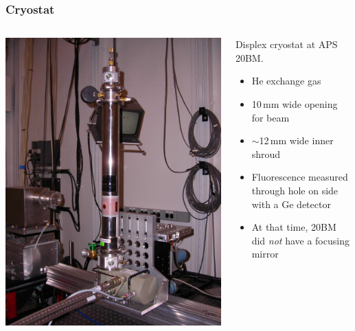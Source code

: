 \documentclass[10pt, xcolor=x11names, compress]{beamer}
\begin{document}
\begin{frame}
  \frametitle{Cryostat}
  \begin{columns}
    \begin{column}{0.5\linewidth}
      \includegraphics[width=0.8\linewidth]{images/displex.jpg}
    \end{column}
    \begin{column}{0.5\linewidth}
      Displex cryostat at APS 20BM.

      \medskip

      \begin{itemize}
      \item He exchange gas
      \item 10\,mm wide opening for beam
      \item \alert{$\sim$12\,mm wide inner shroud}
      \item Fluorescence measured through hole on side with a Ge detector
      \item At that time, 20BM did \textit{not} have a focusing mirror
      \end{itemize}
    \end{column}
  \end{columns}
\end{frame}
\end{document}

